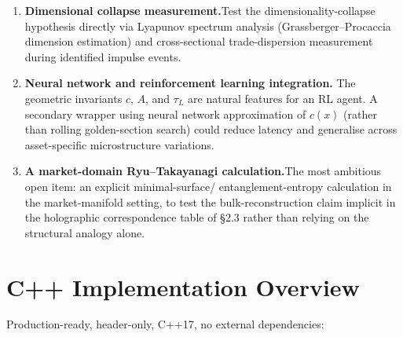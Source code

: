\documentclass[12pt,a4paper]{article}
\begin{document}
\begin{enumerate}
    \item \textbf{Dimensional collapse measurement.}\quad Test the
          dimensionality-collapse hypothesis directly via Lyapunov
          spectrum analysis (Grassberger--Procaccia dimension estimation)
          and cross-sectional trade-dispersion measurement during
          identified impulse events.

    \item \textbf{Neural network and reinforcement learning integration.}
          \quad The geometric invariants $c$, $A$, and $\tau_L$ are
          natural features for an RL agent. A secondary wrapper using
          neural network approximation of $c(x)$ (rather than rolling
          golden-section search) could reduce latency and generalise
          across asset-specific microstructure variations.

    \item \textbf{A market-domain Ryu--Takayanagi calculation.}\quad The
          most ambitious open item: an explicit minimal-surface/
          entanglement-entropy calculation in the market-manifold setting,
          to test the bulk-reconstruction claim implicit in the holographic
          correspondence table of \S2.3 rather than relying on the
          structural analogy alone.
\end{enumerate}


\appendix

\section{C++ Implementation Overview}

Production-ready, header-only, C++17, no external dependencies:
\end{document}
